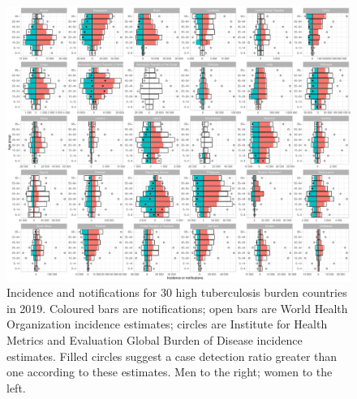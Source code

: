 \documentclass[12pt]{article}
\begin{document}
\begin{figure}
\centering
\includegraphics[width=1\textwidth]{../plots/aF1.pdf}
\caption[Incidence and notifications for 30 countries]{Incidence and
  notifications for 30 high tuberculosis burden countries in 2019.
  Coloured bars are notifications; open bars are World Health Organization incidence estimates; circles are Institute for Health Metrics
  and Evaluation Global Burden of Disease incidence estimates. Filled circles suggest a case detection ratio greater than one according to these estimates. Men to the right; women to the left.}
\end{figure}


\FloatBarrier




\FloatBarrier
\end{document}
